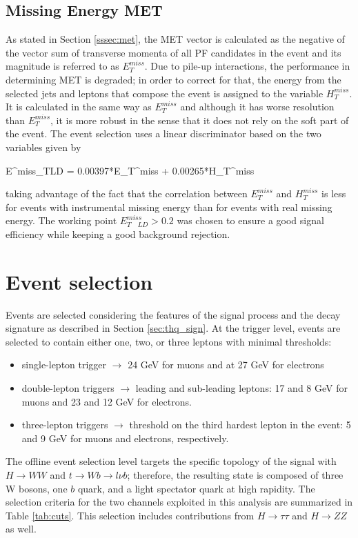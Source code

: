 \subsection{Missing Energy MET}

As stated in Section \ref{sssec:met}, the MET vector is calculated as the negative of the vector sum of transverse momenta of all PF candidates in the event and its magnitude is referred to as $E_T^{miss}$. Due to pile-up interactions, the performance in determining MET is degraded; in order to correct for that, the energy from the selected jets and leptons that compose the event is assigned to the variable $H_T^{miss}$. It is calculated in the same way as  $E_T^{miss}$ and although it has worse resolution than $E_T^{miss}$, it is more robust in the sense that it does not rely on the soft part of the event. The event selection uses a linear discriminator based on the two variables given by 

\beqn
E^{miss}_{T\quad LD} = 0.00397*E_T^{miss} + 0.00265*H_T^{miss}
\eeqn

\noindent taking advantage of the fact that the correlation between $E_T^{miss}$ and  $H_T^{miss}$ is less for events with instrumental missing energy than for events with real missing energy. The working point $E^{miss}_{T\quad LD} > 0.2$ was chosen to ensure a good signal efficiency while keeping a good background rejection.

\section{Event selection}

Events are selected considering the features of the signal process and the decay signature as described in Section \ref{sec:thq_sign}. At the trigger level, events are selected to contain either one, two, or three leptons with minimal \pt thresholds:
\begin{itemize}
\item single-lepton trigger $\to$ 24 GeV for muons and at 27 GeV for electrons
\item double-lepton triggers $\to$ leading and sub-leading leptons: 17 and 8 GeV for muons and 23 and 12 GeV for electrons.
\item three-lepton triggers $\to$ threshold on the third hardest lepton in the event: 5 and 9 GeV for muons and electrons, respectively.
\end{itemize}

The offline event selection level targets the specific topology of the \tHq signal with $H\to WW$ and $t \to Wb \to l\nu b$; therefore, the resulting state is composed of three W bosons, one $b$ quark, and a light spectator quark at high rapidity. The selection criteria for the two channels exploited in this analysis are summarized in Table \ref{tab:cuts}. This selection includes contributions from $H \to \tau\tau$ and $H\to ZZ$ as well.

